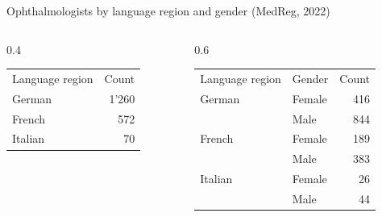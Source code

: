 \documentclass{my_eth_beamer}
\numberwithin{equation}{section}
\begin{document}
\begin{frame}
    \begin{Bsp}[Ophthalmologists]

        \vspace{0.5em}

        Ophthalmologists by language region and gender (MedReg, 2022)

        \vspace{-0.5em}

        \begin{columns}
            \begin{column}{0.4\textwidth}
                \begin{center}
                \begin{tabular}{lr}
                    \toprule
                    \addlinespace
                    Language region & Count\\
                    \addlinespace
                    \midrule
                    German & 1'260\\
                    \addlinespace
                    French & 572\\
                    \addlinespace
                    Italian & 70\\
                    \bottomrule
                \end{tabular}
                \end{center}
            \end{column}
            \begin{column}{0.6\textwidth}
                \begin{center}
                \begin{tabular}{llr}
                    \toprule
                    \addlinespace
                    Language region & Gender & Count\\
                    \addlinespace
                    \midrule
                    German & Female & 416\\
                           & Male & 844\\
                    \addlinespace
                    French & Female & 189\\
                           & Male & 383\\
                    \addlinespace
                    Italian & Female & 26\\
                            & Male & 44\\
                    \bottomrule
                \end{tabular}
                \end{center}
            \end{column}
        \end{columns}
        \vspace{0.5em}
    \end{Bsp}
\end{frame}
\end{document}
